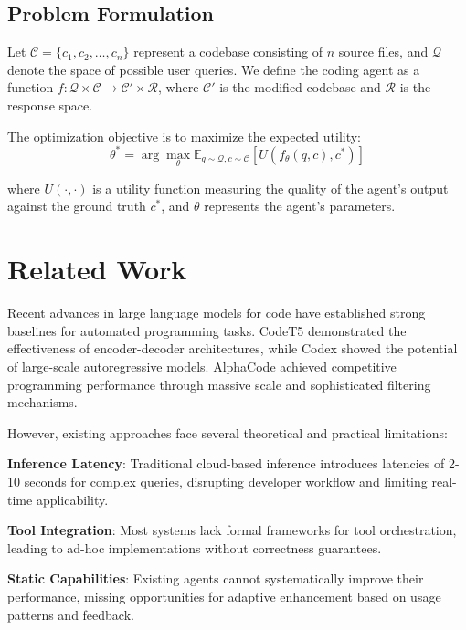 \documentclass[10pt]{article}
\begin{document}
\subsection{Problem Formulation}

Let $\mathcal{C} = \{c_1, c_2, \ldots, c_n\}$ represent a codebase consisting of $n$ source files, and $\mathcal{Q}$ denote the space of possible user queries. We define the coding agent as a function $f: \mathcal{Q} \times \mathcal{C} \rightarrow \mathcal{C}' \times \mathcal{R}$, where $\mathcal{C}'$ is the modified codebase and $\mathcal{R}$ is the response space.

The optimization objective is to maximize the expected utility:
\begin{equation}
\theta^* = \arg\max_{\theta} \mathbb{E}_{q \sim \mathcal{Q}, c \sim \mathcal{C}}[U(f_{\theta}(q, c), c^*)]
\end{equation}

where $U(\cdot, \cdot)$ is a utility function measuring the quality of the agent's output against the ground truth $c^*$, and $\theta$ represents the agent's parameters.

\section{Related Work}

Recent advances in large language models for code have established strong baselines for automated programming tasks. CodeT5 \cite{wang2021codet5} demonstrated the effectiveness of encoder-decoder architectures, while Codex \cite{chen2021evaluating} showed the potential of large-scale autoregressive models. AlphaCode \cite{li2022competition} achieved competitive programming performance through massive scale and sophisticated filtering mechanisms.

However, existing approaches face several theoretical and practical limitations:

\textbf{Inference Latency}: Traditional cloud-based inference introduces latencies of 2-10 seconds for complex queries, disrupting developer workflow and limiting real-time applicability.

\textbf{Tool Integration}: Most systems lack formal frameworks for tool orchestration, leading to ad-hoc implementations without correctness guarantees.

\textbf{Static Capabilities}: Existing agents cannot systematically improve their performance, missing opportunities for adaptive enhancement based on usage patterns and feedback.
\end{document}
